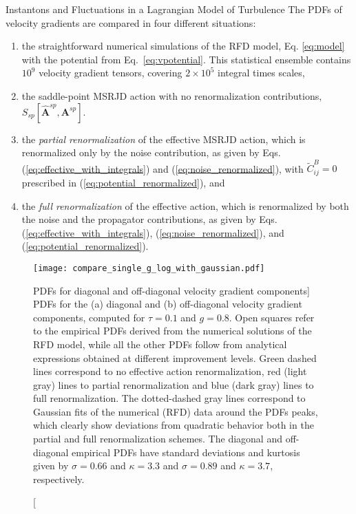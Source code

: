\begin{chapter}{Instantons and Fluctuations in a Lagrangian Model of Turbulence}
The PDFs of velocity gradients are compared in four different situations:
\begin{enumerate}[label=(\roman*)]
\item \label{it:DNS} the straightforward numerical simulations of the RFD model, Eq. \eqref{eq:model} with the potential from Eq.~\eqref{eq:vpotential}. This statistical ensemble contains $10^9$ velocity gradient tensors, covering $2 \times 10^5$  integral times scales, 
\item \label{it:NonR} the saddle-point MSRJD action with no renormalization contributions, $S_{sp}[\hat {\mathbf{A}}^{sp}, {\mathbf{A}}^{sp}]$. 
\item \label{it:NoiseR} the {\textit{ partial renormalization}} of the effective MSRJD action, which is renormalized only by the noise contribution, as given by Eqs. (\ref{eq:effective_with_integrals}) and
(\ref{eq:noise_renormalized}), with $\tilde C^B_{ij}=0$ prescribed in (\ref{eq:potential_renormalized}), and
\item \label{it:FullR} the {\textit{full renormalization}} of the effective action, which is renormalized by both the noise and the propagator contributions, as given by Eqs. (\ref{eq:effective_with_integrals}), (\ref{eq:noise_renormalized}), and (\ref{eq:potential_renormalized}).
\end{enumerate}

\begin{figure}[ht]
 \centering
 \texttt{[image: compare\_single\_g\_log\_with\_gaussian.pdf]}
 \caption
 [PDFs for diagonal and off-diagonal velocity gradient components]
 {PDFs for the (a) diagonal and (b) off-diagonal velocity gradient components, computed for $\tau=0.1$ and $g=0.8$. Open squares refer to the empirical PDFs derived from the numerical solutions of the RFD model, while all the other PDFs follow from analytical expressions obtained at different improvement levels. Green dashed lines correspond to no effective action renormalization, red (light gray) lines to partial renormalization and blue (dark gray) lines to full renormalization.
 The dotted-dashed gray lines correspond to Gaussian fits of the numerical (RFD) data around the PDFs peaks, which clearly show deviations from quadratic behavior both in the partial and full renormalization schemes.
 The diagonal and off-diagonal empirical PDFs have standard deviations and kurtosis given by $\sigma = 0.66$ and $\kappa = 3.3$ and
$\sigma = 0.89$ and $\kappa = 3.7$, respectively.
 }
 \label{fig:pdf-single-g}
\end{figure}


\end{chapter}
